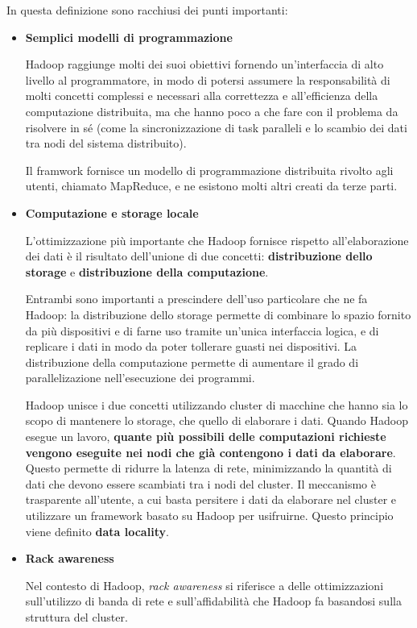 \documentclass[italian,a4paper, twoside, 12pt]{report}
\begin{document}
In questa definizione sono racchiusi dei punti importanti:

\begin{itemize}
\item
  \textbf{Semplici modelli di programmazione}

  Hadoop raggiunge molti dei suoi obiettivi fornendo un'interfaccia di
  alto livello al programmatore, in modo di potersi assumere la
  responsabilità di molti concetti complessi e necessari alla
  correttezza e all'efficienza della computazione distribuita, ma che
  hanno poco a che fare con il problema da risolvere in sé (come la
  sincronizzazione di task paralleli e lo scambio dei dati tra nodi del
  sistema distribuito).

  Il framwork fornisce un modello di programmazione distribuita rivolto
  agli utenti, chiamato MapReduce, e ne esistono molti altri creati da
  terze parti.
\item
  \textbf{Computazione e storage locale}

  L'ottimizzazione più importante che Hadoop fornisce rispetto
  all'elaborazione dei dati è il risultato dell'unione di due concetti:
  \textbf{distribuzione dello storage} e \textbf{distribuzione della
  computazione}.

  Entrambi sono importanti a prescindere dell'uso particolare che ne fa
  Hadoop: la distribuzione dello storage permette di combinare lo spazio
  fornito da più dispositivi e di farne uso tramite un'unica interfaccia
  logica, e di replicare i dati in modo da poter tollerare guasti nei
  dispositivi. La distribuzione della computazione permette di aumentare
  il grado di parallelizazione nell'esecuzione dei programmi.

  Hadoop unisce i due concetti utilizzando cluster di macchine che hanno
  sia lo scopo di mantenere lo storage, che quello di elaborare i dati.
  Quando Hadoop esegue un lavoro, \textbf{quante più possibili delle
  computazioni richieste vengono eseguite nei nodi che già contengono i
  dati da elaborare}. Questo permette di ridurre la latenza di rete,
  minimizzando la quantità di dati che devono essere scambiati tra i
  nodi del cluster. Il meccanismo è trasparente all'utente, a cui basta
  persitere i dati da elaborare nel cluster e utilizzare un framework
  basato su Hadoop per usifruirne. Questo principio viene definito
  \textbf{data locality}.
\item
  \textbf{Rack awareness}

  Nel contesto di Hadoop, \emph{rack awareness} si riferisce a delle
  ottimizzazioni sull'utilizzo di banda di rete e sull'affidabilità che
  Hadoop fa basandosi sulla struttura del cluster.


\end{itemize}
\end{document}
